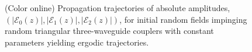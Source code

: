 \documentclass[9pt,twocolumn,twoside]{osajnl}
\begin{document}
\begin{figure}[htbp]
	\centering
	\caption{(Color online) Propagation trajectories of absolute amplitudes, $(\vert \mathcal{E}_{0}(z) \vert, \vert \mathcal{E}_{1}(z) \vert, \vert \mathcal{E}_{2}(z) \vert )$, for initial random fields impinging random triangular three-waveguide couplers with constant parameters yielding ergodic trajectories.}
	\label{fig:Fig7}
\end{figure}
\end{document}
